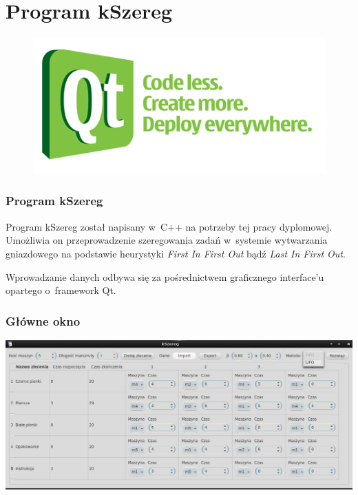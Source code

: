 \documentclass{prezentacja}
\begin{document}
\section{Program kSzereg}
\begin{frame}   
    \begin{figure}
        \vspace{-75pt}
        \includegraphics[width=\linewidth, keepaspectratio=true]{./obrazki/QtLogo}
    \end{figure}
    
    \frametitle{Program kSzereg}
    Program kSzereg został napisany w~C++ na potrzeby tej pracy dyplomowej. Umożliwia on przeprowadzenie szeregowania zadań w~systemie wytwarzania gniazdowego na podstawie heurystyki \emph{First In First Out} bądź \emph{Last In First Out}. 
    
    Wprowadzanie danych odbywa się za pośrednictwem graficznego interface'u opartego o~framework Qt.
\end{frame}
\def\ofset{1.4cm}
\hspace{-\ofset}
\begin{frame}
    \frametitle{\hspace{\ofset}Główne okno}
    \includegraphics[width=\paperwidth-.45cm, keepaspectratio=true]{./obrazki/s1}
\end{frame}
\end{document}
